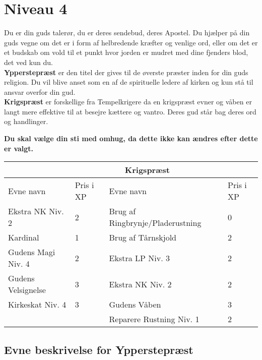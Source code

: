 \chapter*{Niveau 4}
Du er din guds talerør, du er deres sendebud, deres Apostel. Du hjælper på din guds vegne om det er i form af helbredende kræfter og venlige ord, eller om det er et budskab om vold til et punkt hvor jorden er mudret med dine fjenders blod, det ved kun du.\\
\textbf{Ypperstepræst} er den titel der gives til de øverste præster inden for din guds religion. Du vil blive anset som en af de spirituelle ledere af kirken og kun stå til ansvar overfor din gud.\\
\textbf{Krigspræst} er forskellige fra Tempelkrigere da en krigspræst evner og våben er langt mere effektive til at besejre kættere og vantro. Deres gud står bag deres ord og handlinger.

\textbf{Du skal vælge din sti med omhug, da dette ikke kan ændres efter dette er valgt.}\\


\begin{tabular}{|p{}|p{}|p{}|p{}|}
\hline
\rowcolor{cerulean!80}
 \multicolumn{2}{|c|}{ Ypperstepræst } & \multicolumn{2}{|c|}{ Krigspræst }\\
\hline
\rowcolor{cerulean!40}
    Evne navn & Pris i XP & Evne navn & Pris i XP\\ \hline
    Ekstra NK Niv. 2 & 2 & Brug af Ringbrynje/Pladerustning & 0 \\\hline
    
    Kardinal & 1 & Brug af Tårnskjold &2 \\\hline
    
    Gudens Magi Niv. 4 & 2 & Ekstra LP Niv. 3 & 2 \\\hline
    
    Gudens Velsignelse & 3 & Ekstra NK Niv. 2 & 2 \\\hline
    
    Kirkeskat Niv. 4 & 3 & Gudens Våben & 3 \\\hline 
    & & Reparere Rustning Niv. 1 & 2 \\\hline
\end{tabular}

\section*{Evne beskrivelse for Ypperstepræst}

